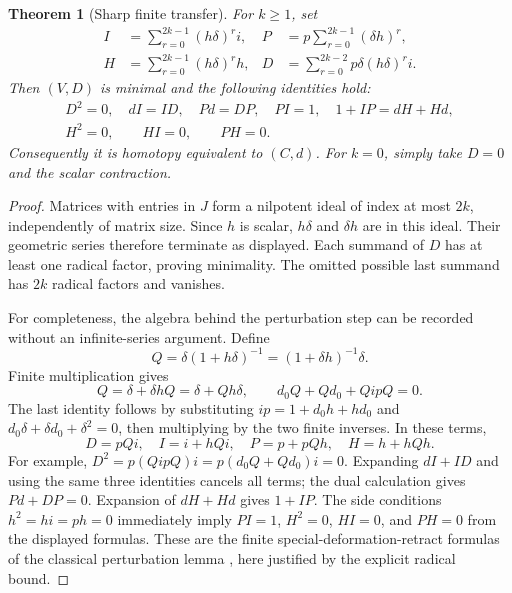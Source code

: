 \documentclass[11pt,letterpaper]{article}
\newtheorem{theorem}{Theorem}[section]
\theoremstyle{definition}
\theoremstyle{remark}
\begin{document}
\begin{theorem}[Sharp finite transfer]\label{thm:transfer}
For $k\geq1$, set
\begin{align}
 I&=\sum_{r=0}^{2k-1}(h\delta)^r i,&
 P&=p\sum_{r=0}^{2k-1}(\delta h)^r,\label{eq:IP}\\
 H&=\sum_{r=0}^{2k-1}(h\delta)^r h,&
 D&=\sum_{r=0}^{2k-2}p\delta(h\delta)^r i.\label{eq:HD}
\end{align}
Then $(V,D)$ is minimal and the following identities hold:
\begin{gather}\label{eq:certificate}
 D^2=0,\quad dI=ID,\quad Pd=DP,\quad PI=1,\quad
 1+IP=dH+Hd,\\
 H^2=0,\qquad HI=0,\qquad PH=0.\nonumber
\end{gather}
Consequently it is homotopy equivalent to $(C,d)$. For $k=0$, simply take
$D=0$ and the scalar contraction.
\end{theorem}
\begin{proof}
Matrices with entries in $J$ form a nilpotent ideal of index at most $2k$,
independently of matrix size. Since $h$ is scalar, $h\delta$ and $\delta h$
are in this ideal. Their geometric series therefore terminate as displayed.
Each summand of $D$ has at least one radical factor, proving minimality.
The omitted possible last summand has $2k$ radical factors and vanishes.

For completeness, the algebra behind the perturbation step can be recorded
without an infinite-series argument. Define
\[
 Q=\delta(1+h\delta)^{-1}=(1+\delta h)^{-1}\delta.
\]
Finite multiplication gives
\[
 Q=\delta+\delta hQ=\delta+Qh\delta,
 \qquad d_0Q+Qd_0+QipQ=0.
\]
The last identity follows by substituting $ip=1+d_0h+hd_0$ and
$d_0\delta+\delta d_0+\delta^2=0$, then multiplying by the two finite
inverses. In these terms,
\[
 D=pQi,\quad I=i+hQi,\quad P=p+pQh,\quad H=h+hQh.
\]
For example,
$D^2=p(QipQ)i=p(d_0Q+Qd_0)i=0$.
Expanding $dI+ID$ and using the same three identities cancels all terms;
the dual calculation gives $Pd+DP=0$. Expansion of $dH+Hd$ gives
$1+IP$. The side conditions $h^2=hi=ph=0$ immediately imply
$PI=1$, $H^2=0$, $HI=0$, and $PH=0$ from the displayed formulas.
These are the finite special-deformation-retract formulas of the classical
perturbation lemma \cite{crainic}, here justified by the explicit radical bound.
\end{proof}
\end{document}
